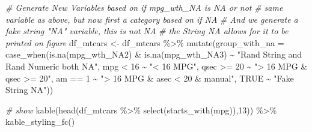 \documentclass[
]{book}
\newenvironment{Shaded}{\begin{snugshade}}{\end{snugshade}}
\newcommand{\AttributeTok}[1]{\textcolor[rgb]{0.77,0.63,0.00}{#1}}
\newcommand{\CommentTok}[1]{\textcolor[rgb]{0.56,0.35,0.01}{\textit{#1}}}
\newcommand{\ConstantTok}[1]{\textcolor[rgb]{0.00,0.00,0.00}{#1}}
\newcommand{\DecValTok}[1]{\textcolor[rgb]{0.00,0.00,0.81}{#1}}
\newcommand{\FunctionTok}[1]{\textcolor[rgb]{0.00,0.00,0.00}{#1}}
\newcommand{\NormalTok}[1]{#1}
\newcommand{\OtherTok}[1]{\textcolor[rgb]{0.56,0.35,0.01}{#1}}
\newcommand{\SpecialCharTok}[1]{\textcolor[rgb]{0.00,0.00,0.00}{#1}}
\newcommand{\StringTok}[1]{\textcolor[rgb]{0.31,0.60,0.02}{#1}}
\begin{document}
\begin{Shaded}
\begin{Highlighting}[]
\CommentTok{\# Generate New Variables based on if mpg\_wth\_NA is NA or not}
\CommentTok{\# same variable as above, but now first a category based on if NA}
\CommentTok{\# And we generate a fake string "NA" variable, this is not NA}
\CommentTok{\# the String NA allows for it to be printed on figure}
\NormalTok{df\_mtcars }\OtherTok{\textless{}{-}}\NormalTok{ df\_mtcars }\SpecialCharTok{\%\textgreater{}\%}
  \FunctionTok{mutate}\NormalTok{(}\AttributeTok{group\_with\_na =} 
           \FunctionTok{case\_when}\NormalTok{(}\FunctionTok{is.na}\NormalTok{(mpg\_wth\_NA2) }\SpecialCharTok{\&} \FunctionTok{is.na}\NormalTok{(mpg\_wth\_NA3) }\SpecialCharTok{\textasciitilde{}} 
                       \StringTok{"Rand String and Rand Numeric both NA"}\NormalTok{, }
\NormalTok{                     mpg }\SpecialCharTok{\textless{}} \DecValTok{16} \SpecialCharTok{\textasciitilde{}} \StringTok{"\textless{} 16 MPG"}\NormalTok{,}
\NormalTok{                     qsec }\SpecialCharTok{\textgreater{}=} \DecValTok{20} \SpecialCharTok{\textasciitilde{}} \StringTok{"\textgreater{} 16 MPG \& qsec \textgreater{}= 20"}\NormalTok{,}
\NormalTok{                     am }\SpecialCharTok{==} \DecValTok{1} \SpecialCharTok{\textasciitilde{}} \StringTok{"\textgreater{} 16 MPG \& asec \textless{} 20 \& manual"}\NormalTok{,}
                     \ConstantTok{TRUE} \SpecialCharTok{\textasciitilde{}} \StringTok{"Fake String NA"}\NormalTok{))}

\CommentTok{\# show}
\FunctionTok{kable}\NormalTok{(}\FunctionTok{head}\NormalTok{(df\_mtcars }\SpecialCharTok{\%\textgreater{}\%} \FunctionTok{select}\NormalTok{(}\FunctionTok{starts\_with}\NormalTok{(}\StringTok{\textquotesingle{}mpg\textquotesingle{}}\NormalTok{)),}\DecValTok{13}\NormalTok{)) }\SpecialCharTok{\%\textgreater{}\%}
  \FunctionTok{kable\_styling\_fc}\NormalTok{()}
\end{Highlighting}
\end{Shaded}
\end{document}
